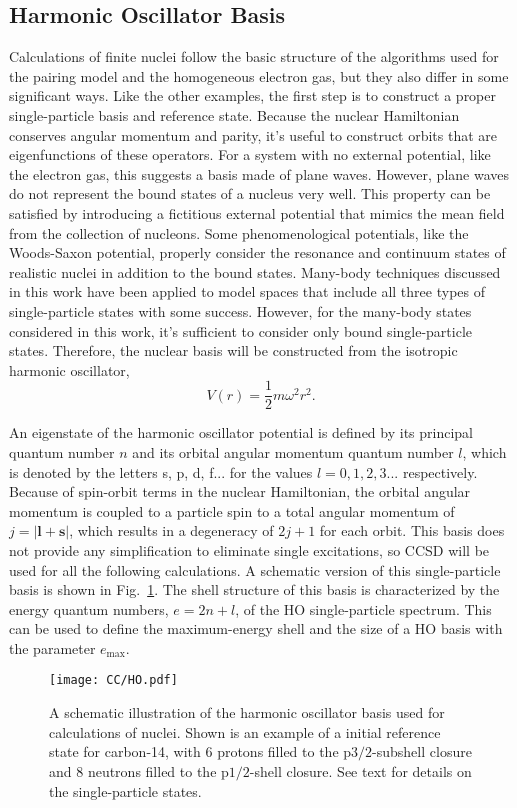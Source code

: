 \documentclass[thesis.tex]{subfiles}
\begin{document}
\subsection{Harmonic Oscillator Basis} \label{section:ho_basis}
Calculations of finite nuclei follow the basic structure of the algorithms used for the pairing model and the homogeneous electron gas, but they also differ in some significant ways.  Like the other examples, the first step is to construct a proper single-particle basis and reference state.  Because the nuclear Hamiltonian conserves angular momentum and parity, it's useful to construct orbits that are eigenfunctions of these operators.  For a system with no external potential, like the electron gas, this suggests a basis made of plane waves.  However, plane waves do not represent the bound states of a nucleus very well.  This property can be satisfied by introducing a fictitious external potential that mimics the mean field from the collection of nucleons.  Some phenomenological potentials, like the Woods-Saxon potential, properly consider the resonance and continuum states of realistic nuclei in addition to the bound states.  Many-body techniques discussed in this work have been applied to model spaces that include all three types of single-particle states \cite{MICHEL2006,HAGEN2007169} with some success.  However, for the many-body states considered in this work, it's sufficient to consider only bound single-particle states.  Therefore, the nuclear basis will be constructed from the isotropic harmonic oscillator,
\begin{equation}
  V\left(r\right) = \frac{1}{2}m\omega^{2}r^{2}.
\end{equation}

An eigenstate of the harmonic oscillator potential is defined by its principal quantum number $n$ and its orbital angular momentum quantum number $l$, which is denoted by the letters s, p, d, f... for the values $l=0,1,2,3...$ respectively.  Because of spin-orbit terms in the nuclear Hamiltonian, the orbital angular momentum is coupled to a particle spin to a total angular momentum of $j = \lvert \mathbf{l} + \mathbf{s} \rvert$, which results in a degeneracy of $2j + 1$ for each orbit.  This basis does not provide any simplification to eliminate single excitations, so CCSD will be used for all the following calculations.  A schematic version of this single-particle basis is shown in Fig.\ \ref{fig:Harmonic_Oscillator}.  The shell structure of this basis is characterized by the energy quantum numbers, $e = 2n + l$, of the HO single-particle spectrum.  This can be used to define the maximum-energy shell and the size of a HO basis with the parameter $e_{\mathrm{max}}$.
\begin{figure}[h]
  \centering
  \texttt{[image: CC/HO.pdf]}
  \caption{A schematic illustration of the harmonic oscillator basis used for calculations of nuclei. Shown is an example of a initial reference state for carbon-14, with 6 protons filled to the p$3/2$-subshell closure and 8 neutrons filled to the p$1/2$-shell closure.  See text for details on the single-particle states.}
  \label{fig:Harmonic_Oscillator}
\end{figure}
\end{document}
